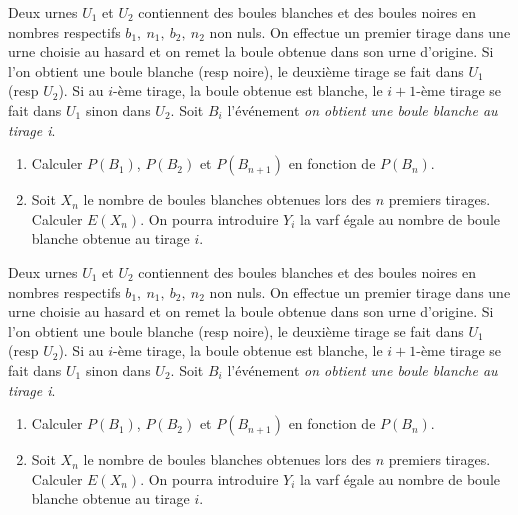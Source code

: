 \documentclass[a4paper, 11pt,reqno]{article}
\begin{document}
\begin{exercice}
	Deux urnes $U_1$ et $U_2$ contiennent des boules blanches et des boules noires en nombres respectifs $b_1,\ n_1,\ b_2,\ n_2$ non nuls. On effectue un premier tirage dans une urne choisie au hasard et on remet la boule obtenue dans son urne d'origine. Si l'on obtient une boule blanche (resp noire), le deuxi\`eme tirage se fait dans $U_1$ (resp $U_2$). Si au $i$-\`eme tirage, la boule obtenue est blanche, le $i+1$-\`eme tirage se fait dans $U_1$ sinon dans $U_2$. Soit $B_i$ l'\'ev\'enement \textit{on obtient une boule blanche au tirage i}.
	\begin{enumerate}
		\item Calculer $P(B_1)$, $P(B_2)$ et $P(B_{n+1})$ en fonction de $P(B_n)$.
		\item Soit $X_n$ le nombre de boules blanches obtenues lors des $n$ premiers tirages. Calculer $E(X_n)$. On pourra introduire $Y_i$ la varf \'egale au nombre de boule blanche obtenue au tirage $i$.
	\end{enumerate}
\end{exercice}
\begin{correction}
	Deux urnes $U_1$ et $U_2$ contiennent des boules blanches et des boules noires en nombres respectifs $b_1,\ n_1,\ b_2,\ n_2$ non nuls. On effectue un premier tirage dans une urne choisie au hasard et on remet la boule obtenue dans son urne d'origine. Si l'on obtient une boule blanche (resp noire), le deuxi\`eme tirage se fait dans $U_1$ (resp $U_2$). Si au $i$-\`eme tirage, la boule obtenue est blanche, le $i+1$-\`eme tirage se fait dans $U_1$ sinon dans $U_2$. Soit $B_i$ l'\'ev\'enement \textit{on obtient une boule blanche au tirage i}.
	\begin{enumerate}
		\item Calculer $P(B_1)$, $P(B_2)$ et $P(B_{n+1})$ en fonction de $P(B_n)$.
		\item Soit $X_n$ le nombre de boules blanches obtenues lors des $n$ premiers tirages. Calculer $E(X_n)$. On pourra introduire $Y_i$ la varf \'egale au nombre de boule blanche obtenue au tirage $i$.
	\end{enumerate}
\end{correction}
\end{document}
